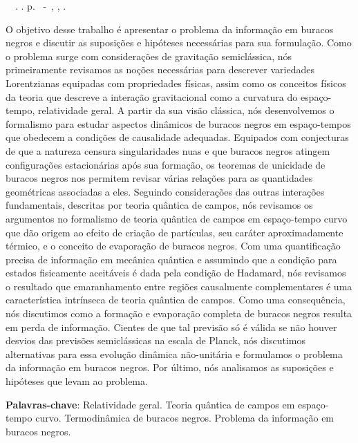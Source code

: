 \documentclass[
12pt,		%
openright,	%
twoside,  %
a4paper,			%
chapter=TITLE,		%
english,			%
french,				%
spanish,			%
brazil				%
]{USPSC-classe/USPSC}
\begin{document}

\setlength{\absparsep}{18pt} %
\begin{resumo}
	\begin{flushleft} 
			\setlength{\absparsep}{0pt} %
			\SingleSpacing 
			\imprimirautorabr~~\textbf{\imprimirtituloresumo}.	\imprimirdata. \pageref{LastPage}p. 
			\imprimirtipotrabalho~-~\imprimirinstituicao, \imprimirlocal, \imprimirdata. 
 	\end{flushleft}
\OnehalfSpacing 		

 O objetivo desse trabalho é apresentar o problema da informação em buracos negros e discutir as suposições e hipóteses necessárias para sua formulação. Como o problema surge com considerações de gravitação semiclássica, nós primeiramente revisamos as noções necessárias para descrever variedades Lorentzianas equipadas com propriedades físicas, assim como os conceitos físicos da teoria que descreve a interação gravitacional como a curvatura do espaço-tempo, relatividade geral. A partir da sua visão clássica, nós desenvolvemos o formalismo para estudar aspectos dinâmicos de buracos negros em espaço-tempos que obedecem a condições de causalidade adequadas. Equipados com conjecturas de que a natureza censura singularidades nuas e que buracos negros atingem configurações estacionárias após sua formação, os teoremas de unicidade de buracos negros nos permitem revisar várias relações para as quantidades geométricas associadas a eles. Seguindo conside\-rações das outras interações fundamentais, descritas por teoria quântica de campos, nós revisamos os argumentos no formalismo de teoria quântica de campos em espaço-tempo curvo que dão origem ao efeito de criação de partículas, seu caráter aproximadamente térmico, e o conceito de evaporação de buracos negros. Com uma quantificação precisa de informação em mecânica quântica e assumindo que a condição para estados fisicamente aceitáveis é dada pela condição de Hadamard, nós revisamos o resultado que emaranhamento entre regiões causalmente complementares é uma característica intrínseca de teoria quântica de campos. Como uma consequência, nós discutimos como a formação e evaporação completa de buracos negros resulta em perda de informação. Cientes de que tal previsão só é válida se não houver desvios das previsões semiclássicas na escala de Planck, nós discutimos alternativas para essa evolução dinâmica não-unitária e formulamos o problema da informação em buracos negros. Por último, nós analisamos as suposições e hipóteses que levam ao problema.

 \textbf{Palavras-chave}: Relatividade geral. Teoria quântica de campos em espaço-tempo curvo. Termodinâmica de buracos negros. Problema da informação em buracos negros.
\end{resumo}
\end{document}
